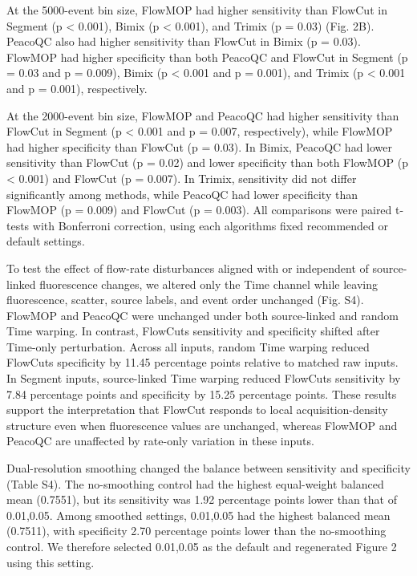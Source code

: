 \documentclass[ASNA]{latex/wiley/USG}
\begin{document}
At the 5000-event bin size, FlowMOP had higher sensitivity than FlowCut
in Segment (p \textless{} 0.001), Bimix (p \textless{} 0.001), and
Trimix (p = 0.03) (Fig. 2B). PeacoQC also had higher sensitivity than
FlowCut in Bimix (p = 0.03). FlowMOP had higher specificity than both
PeacoQC and FlowCut in Segment (p = 0.03 and p = 0.009), Bimix (p
\textless{} 0.001 and p = 0.001), and Trimix (p \textless{} 0.001 and p
= 0.001), respectively.

At the 2000-event bin size, FlowMOP and PeacoQC had higher sensitivity
than FlowCut in Segment (p \textless{} 0.001 and p = 0.007,
respectively), while FlowMOP had higher specificity than FlowCut (p =
0.03). In Bimix, PeacoQC had lower sensitivity than FlowCut (p = 0.02)
and lower specificity than both FlowMOP (p \textless{} 0.001) and
FlowCut (p = 0.007). In Trimix, sensitivity did not differ significantly
among methods, while PeacoQC had lower specificity than FlowMOP (p =
0.009) and FlowCut (p = 0.003). All comparisons were paired t-tests with
Bonferroni correction, using each algorithm\textquotesingle s fixed
recommended or default settings.

To test the effect of flow-rate disturbances aligned with or independent
of source-linked fluorescence changes, we altered only the Time channel
while leaving fluorescence, scatter, source labels, and event order
unchanged (Fig. S4). FlowMOP and PeacoQC were unchanged under both
source-linked and random Time warping. In contrast,
FlowCut\textquotesingle s sensitivity and specificity shifted after
Time-only perturbation. Across all inputs, random Time warping reduced
FlowCut\textquotesingle s specificity by 11.45 percentage points
relative to matched raw inputs. In Segment inputs, source-linked Time
warping reduced FlowCut\textquotesingle s sensitivity by 7.84 percentage
points and specificity by 15.25 percentage points. These results support
the interpretation that FlowCut responds to local acquisition-density
structure even when fluorescence values are unchanged, whereas FlowMOP
and PeacoQC are unaffected by rate-only variation in these inputs.

Dual-resolution smoothing changed the balance between sensitivity and
specificity (Table S4). The no-smoothing control had the highest
equal-weight balanced mean (0.7551), but its sensitivity was 1.92
percentage points lower than that of 0.01,0.05. Among smoothed settings,
0.01,0.05 had the highest balanced mean (0.7511), with specificity 2.70
percentage points lower than the no-smoothing control. We therefore
selected 0.01,0.05 as the default and regenerated Figure 2 using this
setting.
\end{document}
